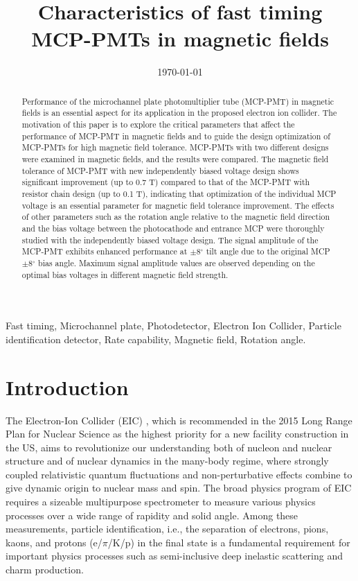 \documentclass[preprint,5p]{elsarticle}
\title{\vspace{-15mm}\fontsize{18pt}{10pt}\selectfont\textbf{Characteristics of fast timing MCP-PMTs in magnetic fields}}
\date{\today}
\begin{document}
\begin{abstract}

Performance of the microchannel plate photomultiplier tube (MCP-PMT) in 
   magnetic fields is an essential aspect for its application in the proposed 
   electron ion collider. The motivation of this paper is to explore the 
   critical parameters that affect the performance of MCP-PMT in magnetic 
   fields and to guide the design optimization of MCP-PMTs for high magnetic 
   field tolerance. MCP-PMTs with two different designs were examined in 
   magnetic fields, and the results were compared. The magnetic field tolerance 
   of MCP-PMT with new independently biased voltage design shows significant 
   improvement (up to 0.7 T) compared to that of the MCP-PMT with resistor 
   chain design (up to 0.1 T), indicating that optimization of the individual 
   MCP voltage is an essential parameter for magnetic field tolerance 
   improvement. The effects of other parameters such as the rotation angle 
   relative to the magnetic field direction and the bias voltage between the 
   photocathode and entrance MCP were thoroughly studied with the independently 
   biased voltage design. The signal amplitude of the MCP-PMT exhibits enhanced 
   performance at $\pm$8$^{\circ}$ tilt angle due to the original MCP 
   $\pm$8$^{\circ}$ bias angle. Maximum signal amplitude values are observed 
   depending on the optimal bias voltages in different magnetic field strength.
\end{abstract}

\maketitle

\begin{keywords}
   Fast timing, Microchannel plate, Photodetector, Electron Ion Collider, 
   Particle identification detector, Rate capability, Magnetic field, Rotation 
   angle.
\end{keywords}




\section{Introduction} \label{sec:level1}
The Electron-Ion Collider (EIC) \cite{1}, which is recommended in the 2015 Long 
Range Plan for Nuclear Science \cite{2} as the highest priority for a new 
facility construction in the US, aims to revolutionize our understanding both 
of nucleon and nuclear structure and of nuclear dynamics in the many-body 
regime, where strongly coupled relativistic quantum fluctuations and 
non-perturbative effects combine to give dynamic origin to nuclear mass and 
spin. The broad physics program of EIC requires a sizeable multipurpose 
spectrometer to measure various physics processes over a wide range of rapidity 
and solid angle. Among these measurements, particle identification, i.e., the 
separation of electrons, pions, kaons, and protons (e/$\pi$/K/p) in the final 
state is a fundamental requirement for important physics processes such as 
semi-inclusive deep inelastic scattering and charm production.
\end{document}
